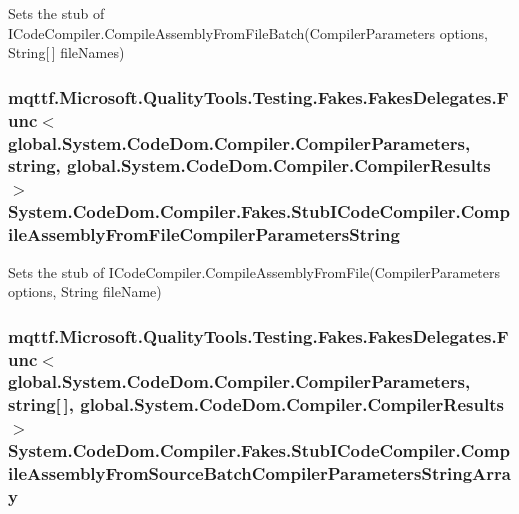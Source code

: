Sets the stub of I\-Code\-Compiler.\-Compile\-Assembly\-From\-File\-Batch(\-Compiler\-Parameters options, String\mbox{[}$\,$\mbox{]} file\-Names)

\hypertarget{class_system_1_1_code_dom_1_1_compiler_1_1_fakes_1_1_stub_i_code_compiler_aa37f09f50760f92c868afc123efbff27}{
\subsubsection[{Compile\-Assembly\-From\-File\-Compiler\-Parameters\-String}]{\setlength{\rightskip}{0pt plus 5cm}mqttf.\-Microsoft.\-Quality\-Tools.\-Testing.\-Fakes.\-Fakes\-Delegates.\-Func$<$global.\-System.\-Code\-Dom.\-Compiler.\-Compiler\-Parameters, string, global.\-System.\-Code\-Dom.\-Compiler.\-Compiler\-Results$>$ System.\-Code\-Dom.\-Compiler.\-Fakes.\-Stub\-I\-Code\-Compiler.\-Compile\-Assembly\-From\-File\-Compiler\-Parameters\-String}}\label{class_system_1_1_code_dom_1_1_compiler_1_1_fakes_1_1_stub_i_code_compiler_aa37f09f50760f92c868afc123efbff27}


Sets the stub of I\-Code\-Compiler.\-Compile\-Assembly\-From\-File(\-Compiler\-Parameters options, String file\-Name)

\hypertarget{class_system_1_1_code_dom_1_1_compiler_1_1_fakes_1_1_stub_i_code_compiler_a174bf06328589d855722e5bf84baa20c}{
\subsubsection[{Compile\-Assembly\-From\-Source\-Batch\-Compiler\-Parameters\-String\-Array}]{\setlength{\rightskip}{0pt plus 5cm}mqttf.\-Microsoft.\-Quality\-Tools.\-Testing.\-Fakes.\-Fakes\-Delegates.\-Func$<$global.\-System.\-Code\-Dom.\-Compiler.\-Compiler\-Parameters, string\mbox{[}$\,$\mbox{]}, global.\-System.\-Code\-Dom.\-Compiler.\-Compiler\-Results$>$ System.\-Code\-Dom.\-Compiler.\-Fakes.\-Stub\-I\-Code\-Compiler.\-Compile\-Assembly\-From\-Source\-Batch\-Compiler\-Parameters\-String\-Array}}\label{class_system_1_1_code_dom_1_1_compiler_1_1_fakes_1_1_stub_i_code_compiler_a174bf06328589d855722e5bf84baa20c}


